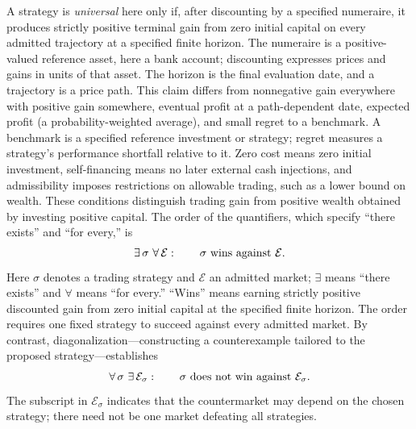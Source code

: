 \documentclass[aps,pra,reprint,superscriptaddress,amsmath,amssymb,floatfix]{revtex4-2}
\theoremstyle{plain}
\theoremstyle{definition}
\theoremstyle{remark}
\begin{document}
A strategy is \emph{universal} here only if, after discounting by a specified
numeraire, it produces strictly positive terminal gain from zero initial
capital on every admitted trajectory at a specified finite horizon. The
numeraire is a positive-valued reference asset, here a bank account;
discounting expresses prices and gains in units of that asset. The horizon is
the final evaluation date, and a trajectory is a price path. This claim differs
from nonnegative gain everywhere with positive gain somewhere, eventual profit
at a path-dependent date, expected profit (a probability-weighted average), and
small regret to a benchmark. A benchmark is a specified reference investment
or strategy; regret measures a strategy's performance shortfall relative to it.
Zero cost means zero initial investment, self-financing means no later external
cash injections, and admissibility imposes restrictions on allowable trading,
such as a lower bound on wealth. These conditions distinguish trading gain
from positive wealth obtained by investing positive capital. The order of the
quantifiers, which specify ``there exists'' and ``for every,'' is
\begin{equation}
  \exists\,\sigma\ \forall\,\mathcal E:
  \qquad \sigma\ \hbox{wins against }\mathcal E.
  \label{eq:universalquantifiers}
\end{equation}
Here \(\sigma\) denotes a trading strategy and \(\mathcal E\) an admitted
market; \(\exists\) means ``there exists'' and \(\forall\) means ``for every.''
``Wins'' means earning strictly positive discounted gain from zero initial
capital at the specified finite horizon. The order requires one fixed strategy
to succeed against every admitted market.
By contrast, diagonalization---constructing a counterexample tailored to the
proposed strategy---establishes
\begin{equation}
  \forall\,\sigma\ \exists\,\mathcal E_\sigma:
  \qquad \sigma\ \hbox{does not win against }\mathcal E_\sigma.
  \label{eq:counterquantifiers}
\end{equation}
The subscript in \(\mathcal E_\sigma\) indicates that the countermarket may
depend on the chosen strategy; there need not be one market defeating all
strategies.
\end{document}

